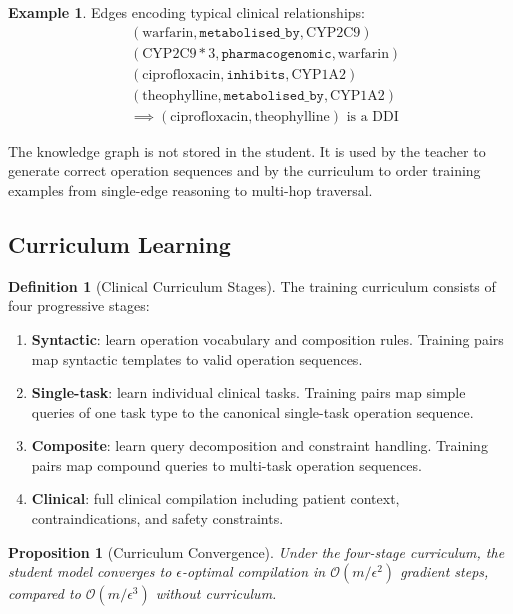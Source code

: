 \documentclass[11pt,twocolumn,a4paper]{article}
\newtheorem{proposition}[theorem]{Proposition}
\theoremstyle{definition}
\newtheorem{definition}[theorem]{Definition}
\newtheorem{example}[theorem]{Example}
\theoremstyle{remark}
\begin{document}
\begin{example}
Edges encoding typical clinical relationships:
\begin{align*}
&(\mathrm{warfarin}, \texttt{metabolised\_by}, \mathrm{CYP2C9}) \\
&(\mathrm{CYP2C9\ast3}, \texttt{pharmacogenomic}, \mathrm{warfarin}) \\
&(\mathrm{ciprofloxacin}, \texttt{inhibits}, \mathrm{CYP1A2}) \\
&(\mathrm{theophylline}, \texttt{metabolised\_by}, \mathrm{CYP1A2}) \\
&\implies (\mathrm{ciprofloxacin}, \mathrm{theophylline}) \text{ is a DDI}
\end{align*}
\end{example}

The knowledge graph is not stored in the student. It is used by the teacher to generate correct operation sequences and by the curriculum to order training examples from single-edge reasoning to multi-hop traversal.

\subsection{Curriculum Learning}

\begin{definition}[Clinical Curriculum Stages]
\label{def:curriculum}
The training curriculum consists of four progressive stages:
\begin{enumerate}[nosep,leftmargin=*]
\item \textbf{Syntactic}: learn operation vocabulary and composition rules. Training pairs map syntactic templates to valid operation sequences.
\item \textbf{Single-task}: learn individual clinical tasks. Training pairs map simple queries of one task type to the canonical single-task operation sequence.
\item \textbf{Composite}: learn query decomposition and constraint handling. Training pairs map compound queries to multi-task operation sequences.
\item \textbf{Clinical}: full clinical compilation including patient context, contraindications, and safety constraints.
\end{enumerate}
\end{definition}

\begin{proposition}[Curriculum Convergence]
\label{prop:curriculum}
Under the four-stage curriculum, the student model converges to $\epsilon$-optimal compilation in $\mathcal{O}(m/\epsilon^2)$ gradient steps, compared to $\mathcal{O}(m/\epsilon^3)$ without curriculum.
\end{proposition}
\end{document}
